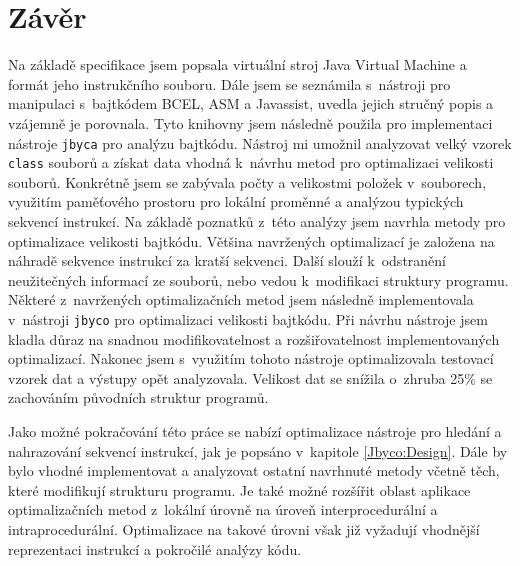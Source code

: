 \chapter{Závěr}\label{Conclusion}


Na základě specifikace \cite{Lindholm:JVM} jsem popsala virtuální stroj Java Virtual Machine a formát jeho instrukčního souboru.  Dále jsem se seznámila s~nástroji pro manipulaci s~bajtkódem BCEL, ASM a Javassist, uvedla jejich stručný popis a vzájemně je porovnala. Tyto knihovny jsem následně použila pro implementaci nástroje \texttt{jbyca} pro analýzu bajtkódu. Nástroj mi umožnil analyzovat velký vzorek \texttt{class} souborů a získat data vhodná k~návrhu metod pro optimalizaci velikosti souborů. Konkrétně jsem se zabývala počty a velikostmi položek v~souborech, využitím paměťového prostoru pro lokální proměnné a analýzou typických sekvencí instrukcí. Na základě poznatků z~této analýzy jsem navrhla metody pro optimalizace velikosti bajtkódu. Většina navržených optimalizací je založena na náhradě sekvence instrukcí za kratší sekvenci. Další slouží k~odstranění neužitečných informací ze souborů, nebo vedou k~modifikaci struktury programu. Některé z~navržených optimalizačních metod jsem následně implementovala v~nástroji \texttt{jbyco} pro optimalizaci velikosti bajtkódu. Při návrhu nástroje jsem kladla důraz na snadnou modifikovatelnost a rozšiřovatelnost implementovaných optimalizací. Nakonec jsem s~využitím tohoto nástroje optimalizovala testovací vzorek dat a výstupy opět analyzovala. 
Velikost dat se snížila o~zhruba 25\% se zachováním původních struktur programů. 

Jako možné pokračování této práce se nabízí optimalizace nástroje pro hledání a nahrazování sekvencí instrukcí, jak je popsáno v~kapitole \ref{Jbyco:Design}.
Dále by bylo vhodné implementovat a analyzovat ostatní navrhnuté metody včetně těch, které modifikují strukturu programu. Je také možné rozšířit oblast aplikace optimalizačních metod z~lokální úrovně na úroveň interprocedurální a intraprocedurální. Optimalizace na takové úrovni však již vyžadují vhodnější reprezentaci instrukcí a pokročilé analýzy kódu.


